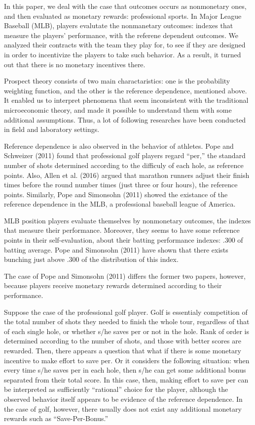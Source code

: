 \documentclass[dvipdfmx, 12pt]{article}
\begin{document}
In this paper, we deal with the case that outcomes occurs as nonmonetary ones, and then evaluated as monetary rewards: professional sports. In Major League Baseball (MLB), players evalutate the nonmanetary outcomes: indexes that measure the players' performance, with the referene dependent outcomes. We analyzed their contracts with the team they play for, to see if they are designed in order to incentivize the players to take such behavior. As a result, it turned out that there is no monetary incentives there.

Prospect theory consists of two main charactaristics: one is the probability weighting function, and the other is the reference dependence, mentioned above. It enabled us to interpret phenomena that seem inconsistent with the traditional microeconomic theory, and made it possible to understand them with some additional assumptions. Thus, a lot of following researches have been conducted in field and laboratory settings.

Reference dependence is also observed in the behavior of athletes. Pope and Schweizer (2011) found that professional golf players regard ``per,'' the standard number of shots determined according to the difficuly of each hole, as reference points. Also, Allen et al. (2016) argued that marathon runners adjust their finish times before the round number times (just three or four hours), the reference points. Similarly, Pope and Simonsohn (2011) showed the existance of the reference dependence in the MLB, a professional baseball league of America.

MLB position players evaluate themselves by nonmonetary outcomes, the indexes that measure their performance. Moreover, they seems to have some reference points in their self-evaluation, about their batting performance indexes: .300 of batting average. Pope and Simonsohn (2011) have shown that there exists bunching just above .300 of the distribution of this index.

The case of Pope and Simonsohn (2011) differs the former two papers, however, because players receive monetary rewards determined according to their performance.

Suppose the case of the professional golf player. Golf is essentialy competition of the total number of shots they needed to finish the whole tour, regardless of that of each single hole, or whether s/he saves per or not in the hole. Rank of order is determined according to the number of shots, and those with better scores are rewarded. Then, there appears a question that what if there is some monetary incentive to make effort to save per. Or it considers the following situation: when every time s/he saves per in each hole, then s/he can get some additional bonus separated from their total score. In this case, then, making effort to save per can be interpreted as sufficiently ``rational'' choice for the player, although the observed behavior itself appears to be evidence of the reference dependence. In the case of golf, however, there usually does not exist any additional monetary rewards such as ``Save-Per-Bonus.''
\end{document}
